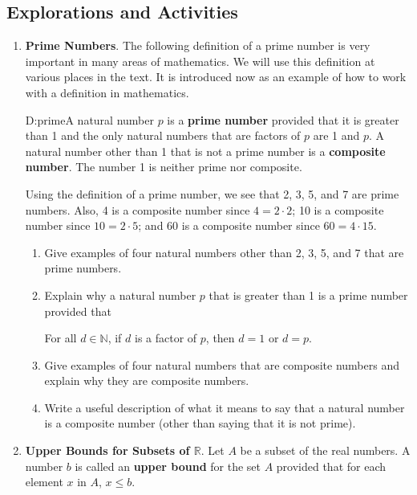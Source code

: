 \subsection*{Explorations and Activities}
\setcounter{oldenumi}{\theenumi}
\begin{enumerate} \setcounter{enumi}{\theoldenumi} 
\item \textbf{Prime Numbers}.  \label{exer:prime} The following definition of a prime number is very important in many areas of mathematics.  We will use this definition at various places in the text.  It is introduced now as an example of how to work with a definition in mathematics. 
\begin{defbox}{D:prime}{A natural number  $p$  is  a \textbf{prime number}
%
 provided that it is greater than 1 and the only natural numbers that are factors of  $p$  are  1  and  $p$.  A natural number other than 1 that is not a prime number is a \textbf{composite number}.
%
  The number 1 is neither prime nor composite.}
\end{defbox}
Using the definition of a prime number, we see that  2, 3, 5, and  7  are prime numbers.  Also, 4  is a composite number since  $4 = 2 \cdot 2$;  10 is a composite number since  $10 = 2 \cdot 5$; and 60 is a composite number since $60 = 4 \cdot 15$.
\label{exer:prime}%
\begin{enumerate}
  \item Give examples of four natural numbers other than 2, 3, 5, and 7 that are prime numbers.
  \item Explain why a natural number  $p$  that is greater than 1 is a prime number provided that
\begin{center} For all  $d \in \mathbb{N}$, if  $d$ is a factor of $p$, then  $d = 1$  or  
$d = p$.
\end{center} 
  \item Give examples of four natural numbers that are composite numbers and explain why they are composite numbers.
  \item Write a useful description of what it means to say that a natural number is a composite number (other than saying that it is not prime).
\end{enumerate}


\item \textbf{Upper Bounds for Subsets of $\mathbb{R}$}.  \label{A:upper}
Let  $A$  be a subset of the real numbers.  A number  $b$  is called an \textbf{upper bound}
%
 for the set  $A$ provided that for each element  $x$  in $A$, $x \leq b$.


\end{enumerate}
